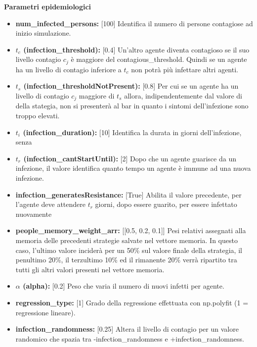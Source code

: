 \documentclass{article}
\begin{document}
{    \textbf{Parametri epidemiologici}
    \begin{itemize}
        \item \textbf{num\_infected\_persons:} [100] Identifica il numero di persone contagiose ad inizio simulazione.
        \item \textbf{$t_{c}$ (infection\_threshold):} [0.4] Un'altro agente diventa contagioso se il suo livello contagio $c_{j}$ è maggiore del contagious\_threshold. Quindi se un agente ha un livello di contagio inferiore a $t_{c}$ non potrà più infettare altri agenti.
        \item \textbf{$t_{s}$ (infection\_thresholdNotPresent):} [0.8] Per cui se un agente ha un livello di contagio $c_{j}$ maggiore di $t_{s}$ allora, indipendentemente dal valore di della stategia, non si presenterà al bar in quanto i sintomi dell'infezione sono troppo elevati.
        \item \textbf{$t_{i}$ (infection\_duration):} [10] Identifica la durata in giorni dell'infezione, senza
        \item \textbf{$t_{r}$ (infection\_cantStartUntil):} [2] Dopo che un agente guarisce da un infezione, il valore identifica quanto tempo un agente è immune ad una nuova infezione.
        \item \textbf{infection\_generatesResistance:} [True] Abilita il valore precedente, per l'agente deve attendere $t_{r}$ giorni, dopo essere guarito, per essere infettato nuovamente
        \item \textbf{people\_memory\_weight\_arr:} [[0.5, 0.2, 0.1]] Pesi relativi assegnati alla memoria delle precedenti strategie salvate nel vettore memoria. In questo caso, l'ultimo valore inciderà per un 50\% sul valore finale della strategia, il penultimo 20\%, il terzultimo 10\% ed il rimanente 20\% verrà ripartito tra tutti gli altri valori presenti nel vettore memoria.
        \item \textbf{$\alpha$ (alpha):} [0.2] Peso che varia il numero di nuovi infetti per agente.
        \item \textbf{regression\_type:} [1] Grado della regressione effettuata con np.polyfit (1 = regressione lineare).
        \item \textbf{infection\_randomness:} [0.25] Altera il livello di contagio per un valore randomico che spazia tra -infection\_randomness e +infection\_randomness.\newline
    \end{itemize}
    
}
\end{document}
